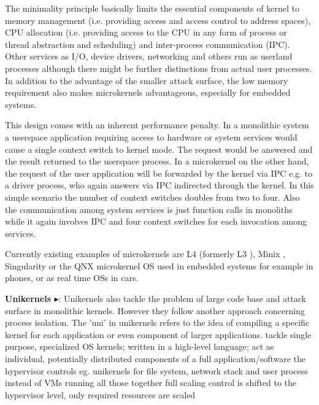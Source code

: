 The minimality principle basically limits the essential components of kernel to memory management (i.e. providing access and access control to address spaces), CPU allocation (i.e. providing access to the CPU in any form of process or thread abstraction and scheduling) and inter-process communication (IPC). Other services as I/O, device drivers, networking and others run as userland processes although there might be further distinctions from actual user processes. In addition to the advantage of the smaller attack surface, the low memory requirement also makes microkernels advantageous, especially for embedded systems. 

This design comes with an inherent performance penalty. In a monolithic system a userspace application requiring access to hardware or system services would cause a single context switch to kernel mode. The request would be answered and the result returned to the userspace process. In a microkernel on the other hand, the request of the user application will be forwarded by the kernel via IPC e.g. to a driver process, who again answers via IPC indirected through the kernel. In this simple scenario the number of context switches doubles from two to four. Also the communication among system services is just function calls in monoliths while it again involves IPC and four context switches for each invocation among services. 

Currently existing examples of microkernels are L4 (formerly L3 \cite{liedtke1993persistent}), Minix \cite{herder2006minix}, Singularity \cite{hunt2005overview} or the QNX microkernel OS\cite{hildebrand1992architectural} used in embedded systems for example in phones, or as real time OSs in cars.

\textbf{Unikernels\cite{madhavapeddy2014unikernels} $\blacktriangleright$}: Unikernels also tackle the problem of large code base and attack surface in monolithic kernels. However they follow another approach concerning process isolation. The 'uni' in unikernels refers to the idea of compiling a specific kernel for each application or even component of larger applications.  
tackle single purpose, specialized OS kernels; written in a high-level language; act as individual, potentially distributed components of a full application/software \means the hypervisor controls eg. unikernels for file system, network stack and user process instead of VMs running all those together \means full scaling control is shifted to the hypervisor level, only required resources are scaled


